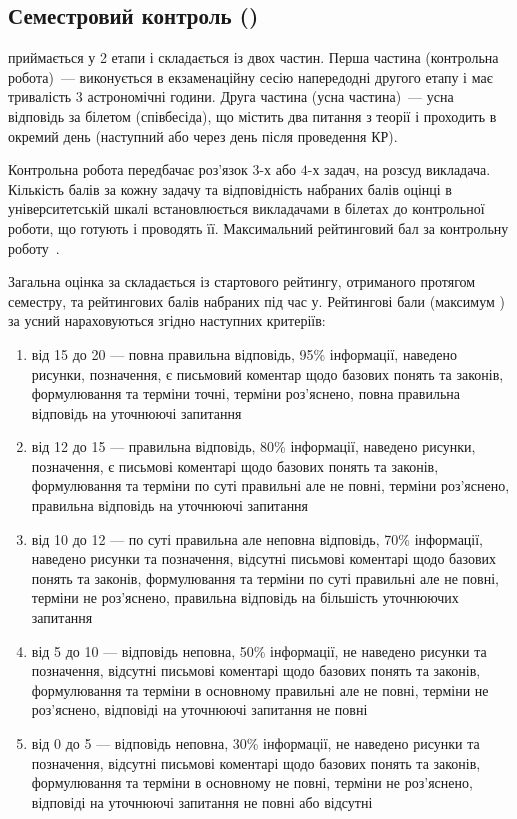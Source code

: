 \documentclass{Syllabus}
\begin{document}
\subsection*{Семестровий контроль (\control)}

\pgfmathsetmacro{\controlBal}{\controlBalPysm + \controlBalUsno}

\Control{} приймається у 2 етапи і складається із двох частин. Перша частина (контрольна робота)~--- виконується в екзаменаційну сесію напередодні другого етапу і має тривалість $3$ астрономічні години. Друга частина (усна частина)~--- усна відповідь за білетом (співбесіда), що містить два питання з теорії і проходить в окремий день (наступний або через день після проведення КР).

Контрольна робота передбачає роз'язок $3$-х або $4$-х задач, на розсуд викладача. Кількість балів за кожну задачу та відповідність набраних балів оцінці в університетській шкалі встановлюється викладачами в білетах до контрольної роботи, що готують і проводять її. Максимальний рейтинговий бал за контрольну роботу~\controlBalPysm.

Загальна оцінка за \control{} складається із стартового рейтингу, отриманого протягом семестру, та рейтингових балів набраних під час \control у. Рейтингові бали (максимум \controlBalUsno) за усний \control{} нараховуються згідно наступних критеріїв:
\begin{enumerate}[label=$\bullet$]
\item від 15 до 20 --- повна правильна відповідь, 95\% інформації, наведено рисунки, позначення, є письмовий коментар щодо базових понять та законів, формулювання та терміни точні, терміни роз’яснено, повна правильна відповідь на уточнюючі запитання
\item від 12 до 15 --- правильна відповідь, 80\% інформації, наведено рисунки, позначення, є письмові коментарі щодо базових понять та законів, формулювання та терміни по суті правильні але не повні, терміни роз’яснено, правильна відповідь на уточнюючі запитання
\item від 10 до 12 --- по суті правильна але неповна відповідь, 70\% інформації, наведено рисунки та позначення, відсутні письмові коментарі щодо базових понять та законів, формулювання та терміни по суті правильні але не повні, терміни не роз’яснено, правильна відповідь на більшість уточнюючих запитання
\item від 5 до 10 --- відповідь неповна, 50\% інформації, не наведено рисунки та позначення, відсутні письмові коментарі щодо базових понять та законів, формулювання та терміни в основному правильні але не повні, терміни не роз’яснено, відповіді на уточнюючі запитання не повні
\item від 0 до 5 --- відповідь неповна, 30\% інформації, не наведено рисунки та позначення, відсутні письмові коментарі щодо базових понять та законів, формулювання та терміни в основному не повні, терміни не роз’яснено, відповіді на уточнюючі запитання не повні або відсутні
\end{enumerate}
\end{document}
